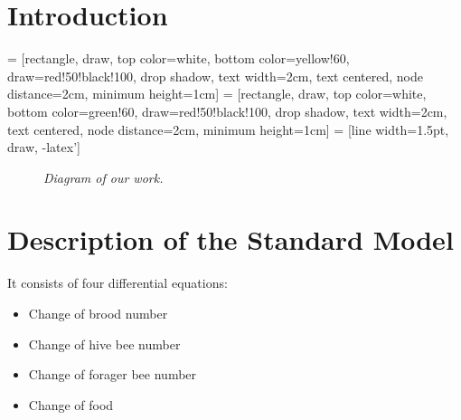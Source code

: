 \documentclass[
	paper=128mm:96mm,
	fontsize=11pt,
	pagesize,
	parskip=half-,
]{scrartcl}
\theoremstyle{mythmstyle} %
\begin{document}
\section{Introduction}
	 = [rectangle, draw, top color=white, bottom color=yellow!60, draw=red!50!black!100, drop shadow, text width=2cm, text centered, node distance=2cm, minimum height=1cm]
	 = [rectangle, draw, top color=white, bottom color=green!60, draw=red!50!black!100, drop shadow, text width=2cm, text centered, node distance=2cm, minimum height=1cm]
	 = [line width=1.5pt, draw, -latex']
	\begin{figure}[h]
		\centering
	
	\caption{\textit{Diagram of our work.}}
		\label{fig:workDiagram}
	\end{figure}
	\clearpage
\section{Description of the Standard Model}
	It consists of four differential equations:
	\begin{itemize}
		\item Change of brood number
		\item Change of hive bee number
		\item Change of forager bee number
		\item Change of food
	\end{itemize}
	\clearpage
\end{document}
